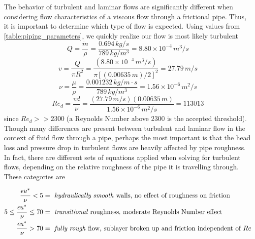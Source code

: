 \documentclass[9pt]{article} %
\numberwithin{equation}{section} %
\begin{document}
The behavior of turbulent and laminar flows are significantly different when considering flow characteristics of a viscous flow through a frictional pipe. Thus, it is important to determine which type of flow is expected. Using values from \ref{table:piping_parameters}, we quickly realize our flow is most likely turbulent
\begin{equation}
Q = \frac{\dot{m}}{\rho} = \frac{0.694\, kg/s}{789\, kg/m^{3}} = 8.80 \times 10^{-4}\, m^{3}/s
\end{equation}
\begin{equation} \label{eq:pipe_fluid_velocity}
v = \frac{Q}{\pi R^{2}} = \frac{(8.80 \times 10^{-4}\, m^{3}/s)}{\pi [(0.00635\, m) / 2]^{2}} = 27.79\, m/s
\end{equation}
\begin{equation}
\nu = \frac{\mu}{\rho} = \frac{0.001232\, kg/m \cdot s}{789\, kg/m^{3}} = 1.56 \times 10^{-6}\, m^{2}/s
\end{equation}
\begin{equation} \label{eq:pipe_fluid_reynolds}
Re_{d} = \frac{v d}{\nu} = \frac{(27.79\, m/s)(0.00635\, m)}{1.56 \times 10^{-6}\, m^{2}/s} = 113013
\end{equation}
since $Re_{d} >> 2300$ (a Reynolds Number above 2300 is the accepted threshold). Though many differences are present between turbulent and laminar flow in the context of fluid flow through a pipe, perhaps the most important is that the head loss and pressure drop in turbulent flows are heavily affected by pipe roughness. In fact, there are different sets of equations applied when solving for turbulent flows, depending on the relative roughness of the pipe it is travelling through. These categories are \cite{fluid-mechanics}

\begin{align*}
\frac{\epsilon u^{*}}{\nu} < 5 &= \text{ \textit{hydraulically smooth} walls, no effect of roughness on friction} \\
5 \leq \frac{\epsilon u^{*}}{\nu} \leq 70 &= \text{ \textit{transitional} roughness, moderate Reynolds Number effect} \\
\frac{\epsilon u^{*}}{\nu} > 70 &= \text{ \textit{fully rough} flow, sublayer broken up and friction independent of } Re
\end{align*}
\end{document}
